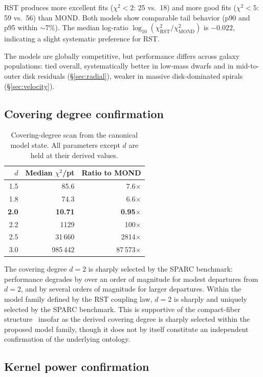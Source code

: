 \documentclass[11pt,a4paper]{article}
\begin{document}
RST produces more excellent fits ($\chi^2 < 2$: 25 vs.\ 18) and more good fits ($\chi^2 < 5$: 59 vs.\ 56) than MOND.
Both models show comparable tail behavior (p90 and p95 within $\sim\!7\%$).
The median log-ratio $\log_{10}(\chi^2_{\mathrm{RST}} / \chi^2_{\mathrm{MOND}})$ is $-0.022$, indicating a slight systematic preference for RST.

The models are globally competitive, but performance differs across galaxy populations: tied overall, systematically better in low-mass dwarfs and in mid-to-outer disk residuals (\S\ref{sec:radial}), weaker in massive disk-dominated spirals (\S\ref{sec:velocity}).

\subsection{Covering degree confirmation}
\label{sec:d-scan}

\begin{table}[h]
\centering
\caption{Covering-degree scan from the canonical model state. All parameters except $d$ are held at their derived values.}
\label{tab:d-scan}
\begin{tabular}{rrr}
\toprule
$d$ & Median $\chi^2$/pt & Ratio to MOND \\
\midrule
1.5 & 85.6 & 7.6$\times$ \\
1.8 & 74.3 & 6.6$\times$ \\
\textbf{2.0} & \textbf{10.71} & \textbf{0.95}$\times$ \\
2.2 & 1129 & 100$\times$ \\
2.5 & 31\,660 & 2814$\times$ \\
3.0 & 985\,442 & 87\,573$\times$ \\
\bottomrule
\end{tabular}
\end{table}

The covering degree $d = 2$ is sharply selected by the SPARC benchmark: performance degrades by over an order of magnitude for modest departures from $d = 2$, and by several orders of magnitude for larger departures.
Within the model family defined by the RST coupling law, $d = 2$ is sharply and uniquely selected by the SPARC benchmark.
This is supportive of the compact-fiber structure~\cite{Wells2026a} insofar as the derived covering degree is sharply selected within the proposed model family, though it does not by itself constitute an independent confirmation of the underlying ontology.

\subsection{Kernel power confirmation}
\label{sec:kernel-scan}
\end{document}
